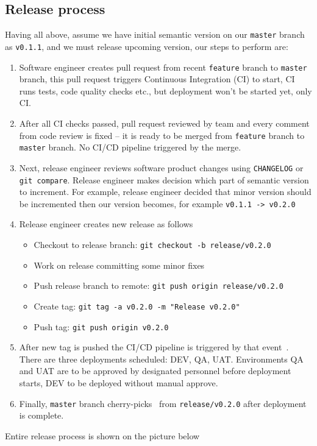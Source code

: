 \subsection{Release process}\label{subsec:release-process}
Having all above, assume we have initial semantic version on our \texttt{master} branch as \texttt{v0.1.1},
and we must release upcoming version, our steps to perform are:
\begin{enumerate}
    \item Software engineer creates pull request from recent \texttt{feature} branch to \texttt{master} branch,
    this pull request triggers Continuous Integration (CI) to start, CI runs tests, code quality checks etc.,
    but deployment won't be started yet, only CI\@.
    \item After all CI checks passed, pull request reviewed by team and every comment from code review is fixed --
    it is ready to be merged from \texttt{feature} branch to \texttt{master} branch.
    No CI/CD pipeline triggered by the merge.
    \item Next, release engineer reviews software product changes using \texttt{CHANGELOG} or \texttt{git compare}.
    Release engineer makes decision which part of semantic version to increment.
    For example, release engineer decided that minor version should be incremented then our version becomes,
    for example \texttt{v0.1.1 -> v0.2.0}
    \item Release engineer creates new release as follows
    \begin{itemize}
        \item Checkout to release branch: \texttt{git checkout -b release/v0.2.0}
        \item Work on release committing some minor fixes
        \item Push release branch to remote: \texttt{git push origin release/v0.2.0}
        \item Create tag: \texttt{git tag -a v0.2.0 -m "Release v0.2.0"}
        \item Push tag: \texttt{git push origin v0.2.0}
    \end{itemize}
    \item After new tag is pushed the CI/CD pipeline is triggered by that event~\cite{AzurePipelinesTriggers}.
    There are three deployments scheduled: DEV, QA, UAT\@.
    Environments QA and UAT are to be approved by designated personnel before deployment starts,
    DEV to be deployed without manual approve.
    \item Finally, \texttt{master} branch cherry-picks~\cite{CherryPick} from \texttt{release/v0.2.0} after deployment is complete.
\end{enumerate}
Entire release process is shown on the picture below


